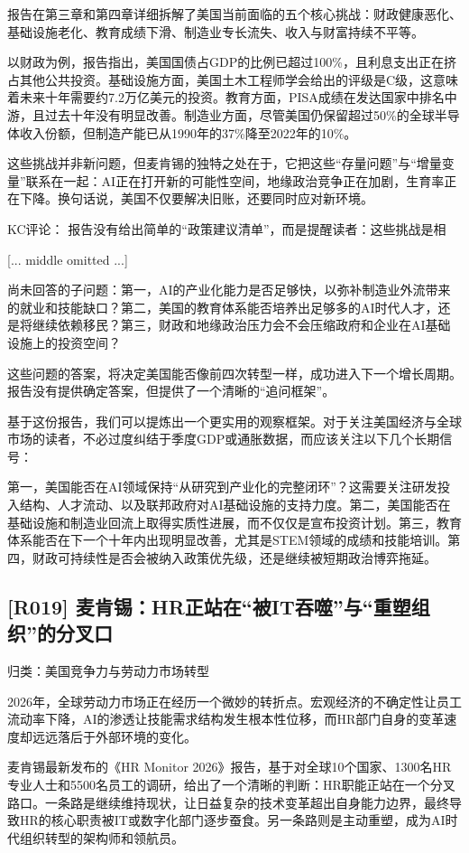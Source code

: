 \documentclass[11pt]{ctexart}
\begin{document}
报告在第三章和第四章详细拆解了美国当前面临的五个核心挑战：财政健康恶化、基础设施老化、教育成绩下滑、制造业专长流失、收入与财富持续不平等。

以财政为例，报告指出，美国国债占GDP的比例已超过100\%，且利息支出正在挤占其他公共投资。基础设施方面，美国土木工程师学会给出的评级是C级，这意味着未来十年需要约7.2万亿美元的投资。教育方面，PISA成绩在发达国家中排名中游，且过去十年没有明显改善。制造业方面，尽管美国仍保留超过50\%的全球半导体收入份额，但制造产能已从1990年的37\%降至2022年的10\%。

这些挑战并非新问题，但麦肯锡的独特之处在于，它把这些“存量问题”与“增量变量”联系在一起：AI正在打开新的可能性空间，地缘政治竞争正在加剧，生育率正在下降。换句话说，美国不仅要解决旧账，还要同时应对新环境。

KC评论： 报告没有给出简单的“政策建议清单”，而是提醒读者：这些挑战是相

[... middle omitted ...]

尚未回答的子问题：第一，AI的产业化能力是否足够快，以弥补制造业外流带来的就业和技能缺口？第二，美国的教育体系能否培养出足够多的AI时代人才，还是将继续依赖移民？第三，财政和地缘政治压力会不会压缩政府和企业在AI基础设施上的投资空间？

这些问题的答案，将决定美国能否像前四次转型一样，成功进入下一个增长周期。报告没有提供确定答案，但提供了一个清晰的“追问框架”。

基于这份报告，我们可以提炼出一个更实用的观察框架。对于关注美国经济与全球市场的读者，不必过度纠结于季度GDP或通胀数据，而应该关注以下几个长期信号：

第一，美国能否在AI领域保持“从研究到产业化的完整闭环”？这需要关注研发投入结构、人才流动、以及联邦政府对AI基础设施的支持力度。第二，美国能否在基础设施和制造业回流上取得实质性进展，而不仅仅是宣布投资计划。第三，教育体系能否在下一个十年内出现明显改善，尤其是STEM领域的成绩和技能培训。第四，财政可持续性是否会被纳入政策优先级，还是继续被短期政治博弈拖延。

\subsection{[R019] 麦肯锡：HR正站在“被IT吞噬”与“重塑组织”的分叉口}
{\small\color{refgray}归类：美国竞争力与劳动力市场转型}

2026年，全球劳动力市场正在经历一个微妙的转折点。宏观经济的不确定性让员工流动率下降，AI的渗透让技能需求结构发生根本性位移，而HR部门自身的变革速度却远远落后于外部环境的变化。

麦肯锡最新发布的《HR Monitor 2026》报告，基于对全球10个国家、1300名HR专业人士和5500名员工的调研，给出了一个清晰的判断：HR职能正站在一个分叉路口。一条路是继续维持现状，让日益复杂的技术变革超出自身能力边界，最终导致HR的核心职责被IT或数字化部门逐步蚕食。另一条路则是主动重塑，成为AI时代组织转型的架构师和领航员。
\end{document}

